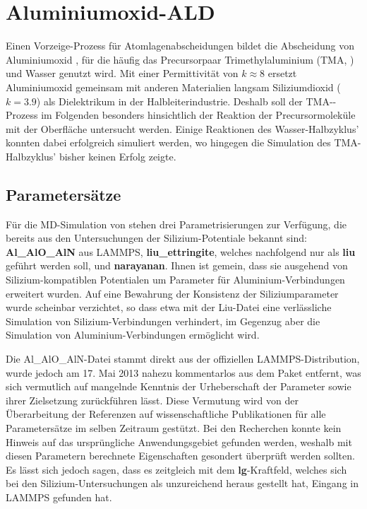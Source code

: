 \section{Aluminiumoxid-ALD}
\label{aluminaald}

Einen Vorzeige-Prozess für Atomlagenabscheidungen bildet die Abscheidung von Aluminiumoxid \cite{puurunen_surface_2005}, für die häufig das Precursorpaar Trimethylaluminium (TMA, ) und Wasser genutzt wird.
Mit einer Permittivität von $k\approx 8$ ersetzt Aluminiumoxid gemeinsam mit anderen Materialien langsam Siliziumdioxid ($k=3.9$) als Dielektrikum in der Halbleiterindustrie.
Deshalb soll der TMA--Prozess im Folgenden besonders hinsichtlich der Reaktion der Precursormoleküle mit der Oberfläche untersucht werden.
Einige Reaktionen des Wasser-Halbzyklus' konnten dabei erfolgreich simuliert werden, wo hingegen die Simulation des TMA-Halbzyklus' bisher keinen Erfolg zeigte.

\subsection{Parametersätze}

Für die MD-Simulation von  stehen drei Parametrisierungen zur Verfügung, die bereits aus den Untersuchungen der Silizium-Potentiale bekannt sind:\\
\textbf{Al\_AlO\_AlN} aus LAMMPS\cite{plimpton_lammps_2014}, \textbf{liu\_ettringite}\cite{liu_development_2012}, welches nachfolgend nur als \textbf{liu} geführt werden soll, und \textbf{narayanan}\cite{narayanan_reactive_2012}.
Ihnen ist gemein, dass sie ausgehend von Silizium-kompatiblen Potentialen um Parameter für Aluminium-Verbindungen erweitert wurden.
Auf eine Bewahrung der Konsistenz der Siliziumparameter wurde scheinbar verzichtet, so dass etwa mit der Liu-Datei eine verlässliche Simulation von Silizium-Verbindungen verhindert, im Gegenzug aber die Simulation von Aluminium-Verbindungen ermöglicht wird.

Die Al\_AlO\_AlN-Datei stammt direkt aus der offiziellen LAMMPS-Distribution, wurde jedoch am 17. Mai 2013 nahezu kommentarlos aus dem Paket entfernt, was sich vermutlich auf mangelnde Kenntnis der Urheberschaft der Parameter sowie ihrer Zielsetzung zurückführen lässt.
Diese Vermutung wird von der Überarbeitung der Referenzen auf wissenschaftliche Publikationen für alle Parametersätze im selben Zeitraum gestützt.
Bei den Recherchen konnte kein Hinweis auf das ursprüngliche Anwendungsgebiet gefunden werden, weshalb mit diesen Parametern berechnete Eigenschaften gesondert überprüft werden sollten.
Es lässt sich jedoch sagen, dass es zeitgleich mit dem \textbf{lg}-Kraftfeld, welches sich bei den Silizium-Untersuchungen als unzureichend heraus gestellt hat, Eingang in LAMMPS gefunden hat.

